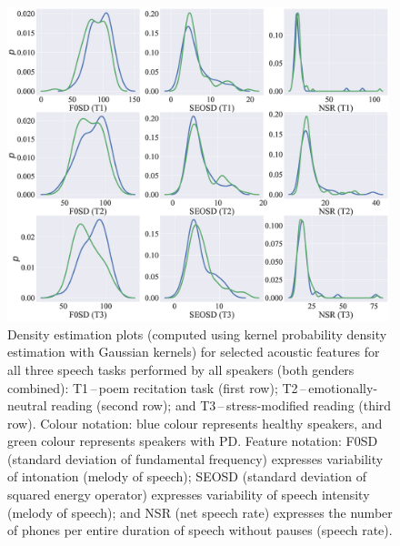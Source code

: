 \begin{figure}[htb!]
	\centering
	\scriptsize
	\includegraphics[width=0.99\textwidth]{pictures/ch4_comparisons_all.eps}
	\caption[Density estimation plots for all speakers.]{Density estimation plots (computed using kernel probability density estimation with Gaussian kernels) for selected acoustic features for all three speech tasks performed by all speakers (both genders combined): T1\,--\,poem recitation task (first row); T2\,--\,emotionally-neutral reading (second row); and T3\,--\,stress-modified reading (third row). Colour notation: blue colour represents healthy speakers, and green colour represents speakers with PD. Feature notation: F0SD (standard deviation of fundamental frequency) expresses variability of intonation (melody of speech); SEOSD (standard deviation of squared energy operator) expresses variability of speech intensity (melody of speech); and NSR (net speech rate) expresses the number of phones per entire duration of speech without pauses (speech rate).}
	\label{fig:ch4_comparisons_all}
\end{figure}

